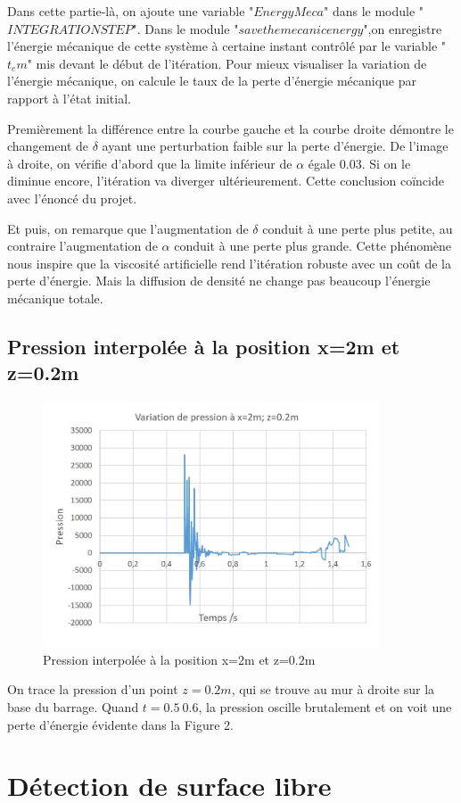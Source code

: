 \documentclass{article}
\begin{document}
Dans cette partie-là, on ajoute une variable "$EnergyMeca$" dans le module "$INTEGRATION STEP$". Dans le module "$save the mecanic energy$",on enregistre l'énergie mécanique de cette système à certaine instant contrôlé par le variable "$t_em$" mis devant le début de l'itération. Pour mieux visualiser la variation de l'énergie mécanique, on calcule le taux de la perte d'énergie mécanique par rapport à l'état initial.

Premièrement la différence entre la courbe gauche et la courbe droite démontre le changement de $\delta$ ayant une perturbation faible sur la perte d'énergie. De l'image à droite, on vérifie d'abord que la limite inférieur de $\alpha$ égale $0.03$. Si on le diminue encore, l'itération va diverger ultérieurement. Cette conclusion coïncide avec l'énoncé du projet.

Et puis, on remarque que l'augmentation de $\delta$ conduit à une perte plus petite, au contraire l'augmentation de $\alpha$ conduit à une perte plus grande. Cette phénomène nous inspire que la viscosité artificielle rend l'itération robuste avec un coût de la perte d'énergie. Mais la diffusion de densité ne change pas beaucoup l'énergie mécanique totale. 
          
\subsection{Pression interpolée à la position x=2m et z=0.2m}
\begin{figure}[H]
	\begin{center}
		\includegraphics[width=10cm]{img/VariationPression.jpg}
	\end{center}
	\caption{Pression interpolée à la position x=2m et z=0.2m}
\end{figure}
On trace la pression d'un point $z=0.2m$, qui se trouve au mur à droite sur la base du barrage. Quand $t=0.5~0.6$, la pression oscille brutalement et on voit une perte d'énergie évidente dans la Figure 2. 
     
\section{Détection de surface libre}
\end{document}

